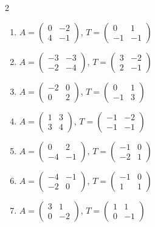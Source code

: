\begin{multicols}{2}
\begin{enumerate}[label=\arabic*., leftmargin=*]
\item $A=\begin{pmatrix}0 & -2\\ 4 & -1\end{pmatrix}$, $T=\begin{pmatrix}0 & 1\\ -1 & -1\end{pmatrix}$
\item $A=\begin{pmatrix}-3 & -3\\ -2 & -4\end{pmatrix}$, $T=\begin{pmatrix}3 & -2\\ 2 & -1\end{pmatrix}$
\item $A=\begin{pmatrix}-2 & 0\\ 0 & 2\end{pmatrix}$, $T=\begin{pmatrix}0 & 1\\ -1 & 3\end{pmatrix}$
\item $A=\begin{pmatrix}1 & 3\\ 3 & 4\end{pmatrix}$, $T=\begin{pmatrix}-1 & -2\\ -1 & -1\end{pmatrix}$
\item $A=\begin{pmatrix}0 & 2\\ -4 & -1\end{pmatrix}$, $T=\begin{pmatrix}-1 & 0\\ -2 & 1\end{pmatrix}$
\item $A=\begin{pmatrix}-4 & -1\\ -2 & 0\end{pmatrix}$, $T=\begin{pmatrix}-1 & 0\\ 1 & 1\end{pmatrix}$
\item $A=\begin{pmatrix}3 & 1\\ 0 & -2\end{pmatrix}$, $T=\begin{pmatrix}1 & 1\\ 0 & -1\end{pmatrix}$

\end{enumerate}
\end{multicols}
